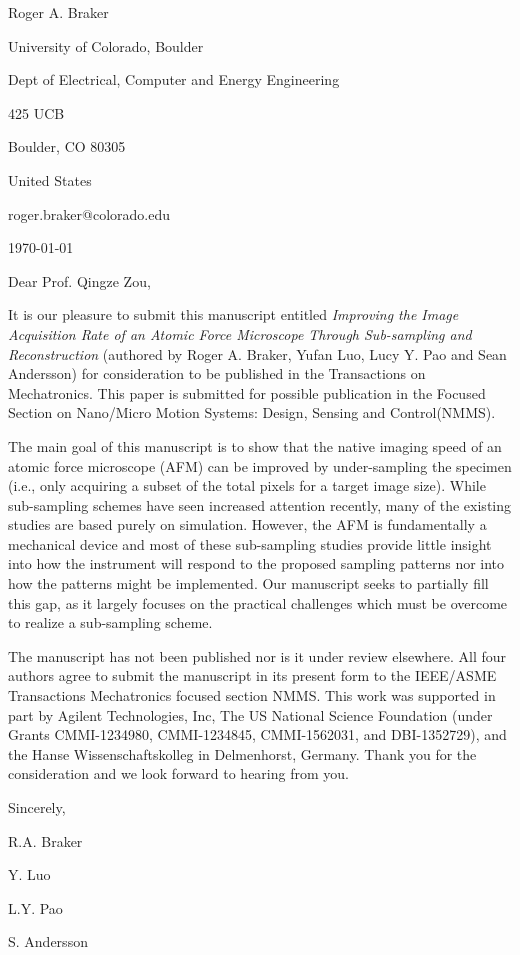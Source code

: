 \documentclass[a4paper,twoside]{article}
\begin{document}
\hspace*{0.45\linewidth}
\begin{minipage}{0.52\linewidth}
Roger A. Braker\par
University of Colorado, Boulder\par
Dept of Electrical, Computer and Energy Engineering \par
425 UCB\par
Boulder, CO 80305\par
United States\par
roger.braker@colorado.edu\par
\today
\end{minipage}
\par\bigskip

Dear Prof. Qingze Zou,\par\bigskip

It is our pleasure to submit this manuscript entitled \textit{Improving the Image Acquisition Rate of an Atomic Force Microscope Through Sub-sampling and Reconstruction} (authored by Roger A. Braker, Yufan Luo, Lucy Y. Pao and Sean Andersson) for consideration to be published in the Transactions on Mechatronics. This paper is submitted for possible publication in the Focused Section on Nano/Micro Motion  Systems:  Design,  Sensing  and  Control(NMMS).

The main goal of this manuscript is to show that the native imaging speed of an atomic force microscope (AFM) can be improved by under-sampling  the specimen (i.e., only acquiring a subset of the total pixels for a target image size). While sub-sampling schemes have seen increased attention recently, many of the existing studies are based purely on simulation. However, the AFM is fundamentally a mechanical device and most of these sub-sampling studies provide little insight
into how the instrument will respond to the proposed sampling patterns nor into how the patterns might be implemented. Our manuscript seeks to partially fill this gap, as it largely focuses on the practical challenges which must be overcome to realize a sub-sampling scheme.

The manuscript has not been published nor is it under review elsewhere. All four authors agree to submit the manuscript in its present form to the IEEE/ASME Transactions Mechatronics focused section NMMS. This work was supported in part by Agilent Technologies, Inc, The US National Science Foundation (under Grants CMMI-1234980, CMMI-1234845, CMMI-1562031, and DBI-1352729), and the Hanse Wissenschaftskolleg in Delmenhorst, Germany. Thank you for the consideration and we look forward to hearing from you.

\par\bigskip
\noindent Sincerely,
\par\bigskip
\noindent R.A. Braker\par
\noindent Y. Luo\par
\noindent L.Y. Pao\par
\noindent S. Andersson
\end{document}
